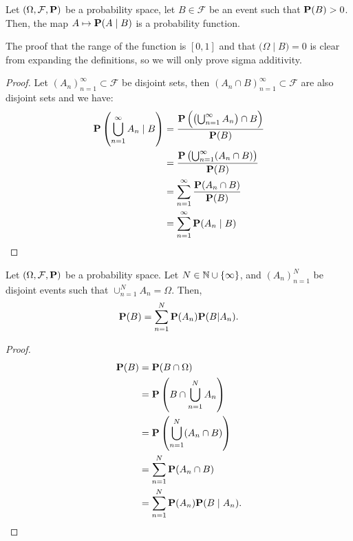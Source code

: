 \documentclass[11pt,a4paper]{article}
\begin{document}
  \begin{proposition}
    Let $(\Omega, \mathcal F, \mathbf{P})$ be a probability space, let 
    $B \in \mathcal F$ be an event such that $\mathbf{P}(B) > 0$. Then,
    the map $A \mapsto \mathbf{P}(A \mid B)$ is a probability function.
  \end{proposition}
  The proof that the range of the function is $[0,1]$ and that 
  $\mathbf (\Omega \mid B) = 0$ is clear from expanding the definitions,
  so we will only prove sigma additivity.
  \begin{proof}
    Let $(A_n)_{n=1}^{\infty} \subset \mathcal F$ be disjoint sets, then
    $(A_n \cap B)_{n=1}^{\infty} \subset \mathcal F$ are also disjoint sets
    and we have:
      \begin{align*}
        \mathbf{P}\left( \bigcup_{n=1}^{\infty} A_n \mid B \right) 
        & = \frac{\mathbf{P}\left( \left( \bigcup_{n=1}^{\infty} A_n \right) \cap B \right)}{\mathbf{P}(B)} \\
        & = \frac{\mathbf{P}\left( \bigcup_{n=1}^{\infty} (A_n \cap B) \right)}{\mathbf{P}(B)} \\
        & = \sum_{n=1}^{\infty} \frac{\mathbf{P}(A_n \cap B)}{\mathbf{P}(B)} \\
        & = \sum_{n=1}^{\infty} \mathbf{P}(A_n \mid B)
      \end{align*}
  \end{proof}

  \begin{proposition}
    Let $(\Omega, \mathcal F, \mathbf{P})$ be a probability space.
    Let $N \in \mathbb{N} \cup \{\infty\}$, and $(A_n)_{n=1}^{N}$ be disjoint events
    such that $\cup_{n=1}^{N} A_n = \Omega$. Then,
    \[
      \mathbf{P}(B)=\sum_{n=1}^{N}\mathbf{P}(A_{n})\mathbf{P}(B|A_{n}).
    \]
  \end{proposition}
  \begin{proof}
    \begin{align*}
      \mathbf{P}(B) &= 
      \mathbf{P}(B \cap \Omega) \\ &= 
      \mathbf{P}\left( B \cap \bigcup_{n=1}^{N} A_n \right) \\ &= 
      \mathbf{P}\left( \bigcup_{n=1}^{N} (A_n \cap B) \right) \\ &= 
      \sum_{n=1}^{N} \mathbf{P}(A_n \cap B) \\ &= 
      \sum_{n=1}^{N} \mathbf{P}(A_n) \mathbf{P}(B \mid A_n).
      \end{align*}
  \end{proof}
\end{document}
